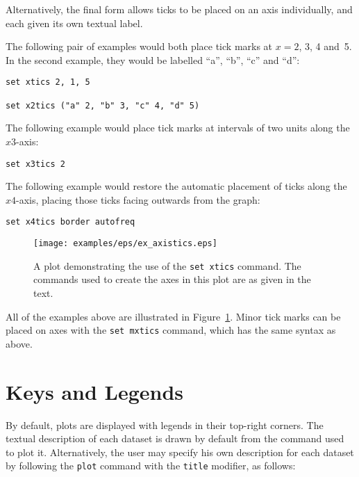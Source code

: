 Alternatively, the final form allows ticks to be placed on an axis
individually, and each given its own textual label.

The following pair of examples would both place tick marks at $x=2$, 3, 4 and~5.
In the second example, they would be labelled ``a'', ``b'', ``c'' and ``d'':

\begin{verbatim}
set xtics 2, 1, 5

set x2tics ("a" 2, "b" 3, "c" 4, "d" 5)
\end{verbatim}

The following example would place tick marks at intervals of two units along
the $x3$-axis:

\begin{verbatim}
set x3tics 2
\end{verbatim}

The following example would restore the automatic placement of ticks along the
$x4$-axis, placing those ticks facing outwards from the graph:

\begin{verbatim}
set x4tics border autofreq
\end{verbatim}

\begin{figure}
\begin{center}
\texttt{[image: examples/eps/ex\_axistics.eps]}
\end{center}
\caption{A plot demonstrating the use of the {\tt set xtics} command. The commands used to create the axes in this plot are as given in the text.}
\label{fig:ex_axistics}
\end{figure}


All of the examples above are illustrated in Figure~\ref{fig:ex_axistics}.
Minor tick marks can be placed on axes with the {\tt set mxtics} command,
which has the same syntax as above.

\section{Keys and Legends}

By default, plots are displayed with legends in their top-right corners. The
textual description of each dataset is drawn by default from the command used
to plot it. Alternatively, the user may specify his own description for each
dataset by following the {\tt plot} command with the {\tt title}
modifier, as follows:

